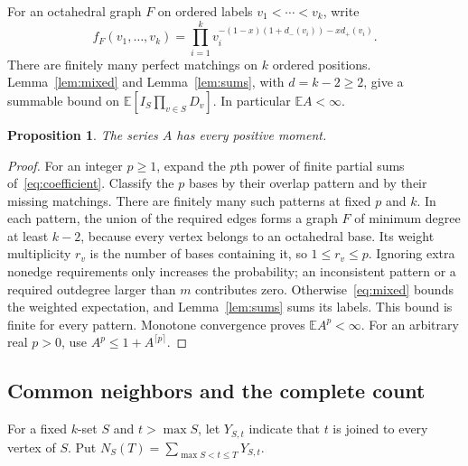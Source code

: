 \documentclass[11pt]{article}
\newtheorem{proposition}[theorem]{Proposition}
\theoremstyle{remark}\newtheorem{remark}[theorem]{Remark}
\newcommand{\E}{\mathbb E}
\begin{document}
For an octahedral graph $F$ on ordered labels $v_1<\cdots<v_k$, write
\begin{equation}\label{eq:f-base}
 f_F(v_1,\ldots,v_k)
 =\prod_{i=1}^k v_i^{-(1-x)(1+d_-(v_i))-x d_+(v_i)}.
\end{equation}
There are finitely many perfect matchings on $k$ ordered positions.
Lemma~\ref{lem:mixed} and Lemma~\ref{lem:sums}, with $d=k-2\ge2$,
give a summable bound on $\E[I_S\prod_{v\in S}D_v]$.
In particular $\E A<\infty$.

\begin{proposition}\label{prop:moments}
The series $A$ has every positive moment.
\end{proposition}
\begin{proof}
For an integer $p\ge1$, expand the $p$th power of finite partial sums
of~\eqref{eq:coefficient}. Classify the $p$ bases by their overlap pattern
and by their missing matchings. There are finitely many such patterns at
fixed $p$ and $k$. In each pattern, the union of the required edges forms
a graph $F$ of minimum degree at least $k-2$, because every vertex belongs
to an octahedral base. Its weight multiplicity $r_v$ is the number of bases
containing it, so $1\le r_v\le p$.
Ignoring extra nonedge requirements only increases the probability; an
inconsistent pattern or a required outdegree larger than $m$ contributes
zero. Otherwise~\eqref{eq:mixed} bounds the weighted expectation, and
Lemma~\ref{lem:sums} sums its labels. This bound is finite for every
pattern. Monotone convergence proves $\E A^p<\infty$.
For an arbitrary real $p>0$, use $A^p\le1+A^{\lceil p\rceil}$.
\end{proof}

\subsection{Common neighbors and the complete count}
For a fixed $k$-set $S$ and $t>\max S$, let $Y_{S,t}$ indicate that $t$
is joined to every vertex of $S$. Put
$N_S(T)=\sum_{\max S<t\le T}Y_{S,t}$.
\end{document}
